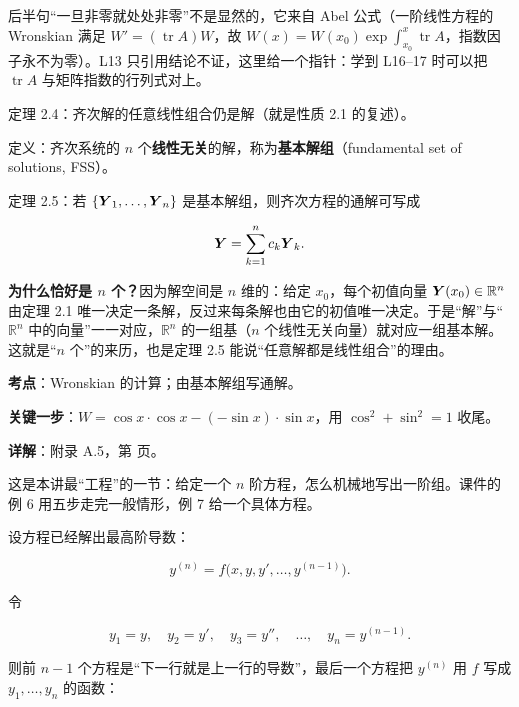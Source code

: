 \documentclass[11pt]{ctexart}
\renewcommand{\qbreak}{\needspace{0.26\textheight}}
\newcommand{\tr}{\operatorname{tr}}
\begin{document}
后半句“一旦非零就处处非零”不是显然的，它来自 Abel 公式（一阶线性方程的 Wronskian 满足 $W'=(\tr A)W$，故 $W(x)=W(x_0)\exp\int_{x_0}^{x}\tr A$，指数因子永不为零）。L13 只引用结论不证，这里给一个指针：学到 L16--17 时可以把 $\tr A$ 与矩阵指数的行列式对上。


定理 2.4：齐次解的任意线性组合仍是解（就是性质 2.1 的复述）。

定义：齐次系统的 $n$ 个\textbf{线性无关}的解，称为\textbf{基本解组}（fundamental set of solutions, FSS）。

定理 2.5：若 $\{\boldsymbol{Y}_1,\dots,\boldsymbol{Y}_n\}$ 是基本解组，则齐次方程的通解可写成

\[
\boldsymbol{Y}=\sum_{k=1}^{n}c_k\boldsymbol{Y}_k .
\]

\textbf{为什么恰好是 $n$ 个？}因为解空间是 $n$ 维的：给定 $x_0$，每个初值向量 $\boldsymbol{Y}(x_0)\in\mathbb{R}^n$ 由定理 2.1 唯一决定一条解，反过来每条解也由它的初值唯一决定。于是“解”与“$\mathbb{R}^n$ 中的向量”一一对应，$\mathbb{R}^n$ 的一组基（$n$ 个线性无关向量）就对应一组基本解。这就是“$n$ 个”的来历，也是定理 2.5 能说“任意解都是线性组合”的理由。


\qbreak
{}
\par\textbf{考点}：Wronskian 的计算；由基本解组写通解。
\par\textbf{关键一步}：$W=\cos x\cdot\cos x-(-\sin x)\cdot\sin x$，用 $\cos^2+\sin^2=1$ 收尾。
\par\textbf{详解}：附录 A.5，第 \pageref{c1:app:a5} 页。


这是本讲最“工程”的一节：给定一个 $n$ 阶方程，怎么机械地写出一阶组。课件的例 6 用五步走完一般情形，例 7 给一个具体方程。


设方程已经解出最高阶导数：

\[
y^{(n)}=f\bigl(x,y,y',\dots,y^{(n-1)}\bigr).
\]

令

\[
y_1=y,\quad y_2=y',\quad y_3=y'',\quad \dots,\quad y_n=y^{(n-1)} .
\]

则前 $n-1$ 个方程是“下一行就是上一行的导数”，最后一个方程把 $y^{(n)}$ 用 $f$ 写成 $y_1,\dots,y_n$ 的函数：
\end{document}
